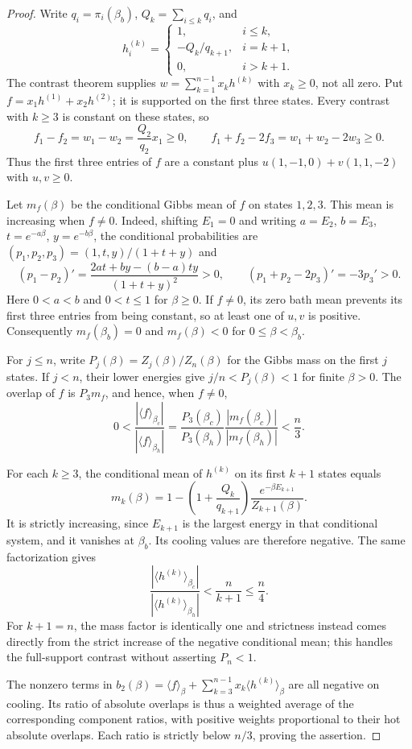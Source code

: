 \documentclass[11pt]{article}
\begin{document}
\begin{proof}
Write $q_i=\pi_i(\beta_b)$, $Q_k=\sum_{i\leq k}q_i$, and
\[
h^{(k)}_i=
\begin{cases}
1,&i\leq k,\\
-Q_k/q_{k+1},&i=k+1,\\
0,&i>k+1.
\end{cases}
\]
The contrast theorem supplies $w=\sum_{k=1}^{n-1}x_kh^{(k)}$ with
$x_k\geq0$, not all zero. Put
$f=x_1h^{(1)}+x_2h^{(2)}$; it is supported on the first three states.
Every contrast with $k\geq3$ is constant on these states, so
\[
f_1-f_2=w_1-w_2=\frac{Q_2}{q_2}x_1\geq0,
\qquad f_1+f_2-2f_3=w_1+w_2-2w_3\geq0.
\]
Thus the first three entries of $f$ are a constant plus
$u(1,-1,0)+v(1,1,-2)$ with $u,v\geq0$.

Let $m_f(\beta)$ be the conditional Gibbs mean of $f$ on states
$1,2,3$. This mean is increasing when $f\ne0$. Indeed, shifting
$E_1=0$ and writing $a=E_2$, $b=E_3$, $t=e^{-a\beta}$,
$y=e^{-b\beta}$, the conditional probabilities are
$(p_1,p_2,p_3)=(1,t,y)/(1+t+y)$ and
\[
(p_1-p_2)'=
\frac{2at+by-(b-a)ty}{(1+t+y)^2}>0,
\qquad (p_1+p_2-2p_3)'=-3p_3'>0.
\]
Here $0<a<b$ and $0<t\leq1$ for $\beta\geq0$.
If $f\ne0$, its zero bath mean prevents its first three entries from
being constant, so at least one of $u,v$ is positive. Consequently
$m_f(\beta_b)=0$ and $m_f(\beta)<0$ for $0\leq\beta<\beta_b$.

For $j\leq n$, write $P_j(\beta)=Z_j(\beta)/Z_n(\beta)$ for the
Gibbs mass on the first $j$ states. If $j<n$, their lower energies give
$j/n<P_j(\beta)<1$ for finite $\beta>0$. The overlap of $f$ is
$P_3m_f$, and hence, when $f\ne0$,
\[
0<\frac{|\langle f\rangle_{\beta_c}|}
        {|\langle f\rangle_{\beta_h}|}
=\frac{P_3(\beta_c)}{P_3(\beta_h)}
  \frac{|m_f(\beta_c)|}{|m_f(\beta_h)|}
<\frac n3.
\]

For each $k\geq3$, the conditional mean of $h^{(k)}$ on its first
$k+1$ states equals
\[
m_k(\beta)=1-\left(1+\frac{Q_k}{q_{k+1}}\right)
 \frac{e^{-\beta E_{k+1}}}{Z_{k+1}(\beta)}.
\]
It is strictly increasing, since $E_{k+1}$ is the largest energy in
that conditional system, and it vanishes at $\beta_b$. Its cooling
values are therefore negative. The same factorization gives
\[
\frac{|\langle h^{(k)}\rangle_{\beta_c}|}
     {|\langle h^{(k)}\rangle_{\beta_h}|}
<\frac{n}{k+1}\leq\frac n4.
\]
For $k+1=n$, the mass factor is identically one and strictness instead
comes directly from the strict increase of the negative conditional
mean; this handles the full-support contrast without asserting
$P_n<1$.

The nonzero terms in
$b_2(\beta)=\langle f\rangle_\beta+
\sum_{k=3}^{n-1}x_k\langle h^{(k)}\rangle_\beta$
are all negative on cooling. Its ratio of absolute overlaps is thus a
weighted average of the corresponding component ratios, with positive
weights proportional to their hot absolute overlaps. Each ratio is
strictly below $n/3$, proving the assertion.
\end{proof}
\end{document}
